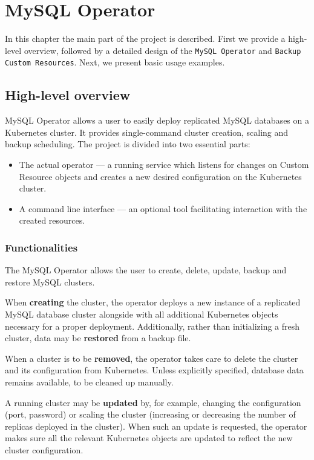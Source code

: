 \chapter{MySQL Operator}

In this chapter the main part of the project is described. First we provide a high-level overview,
followed by a detailed design of the \texttt{MySQL Operator} and \texttt{Backup Custom Resources}. Next, we present
basic usage examples.

\section{High-level overview}
MySQL Operator allows a user to easily deploy replicated MySQL databases on a Kubernetes cluster.
It provides single-command cluster creation, scaling and backup scheduling. The project is divided
into two essential parts:
\begin{itemize}
	\item The actual operator --- a running service which listens for changes on Custom Resource
	objects and creates a new desired configuration on the Kubernetes cluster.
	\item A command line interface --- an optional tool facilitating interaction with the created
	resources.
\end{itemize}

\subsection{Functionalities}
The MySQL Operator allows the user to create, delete, update, backup and restore MySQL clusters.

When \textbf{creating} the cluster, the operator deploys a new instance of a replicated MySQL
database cluster alongside with all additional Kubernetes objects necessary for a proper deployment.
Additionally, rather than initializing a fresh cluster, data may be
\textbf{restored} from a backup file.

When a cluster is to be \textbf{removed}, the operator takes care to delete the cluster and its
configuration from Kubernetes. Unless explicitly specified, database data remains available, to be
cleaned up manually.

A running cluster may be \textbf{updated} by, for example, changing the configuration (port,
password) or scaling the cluster (increasing or decreasing the number of replicas deployed in the
cluster). When such an update is requested, the operator makes sure all the relevant Kubernetes
objects are updated to reflect the new cluster configuration.

